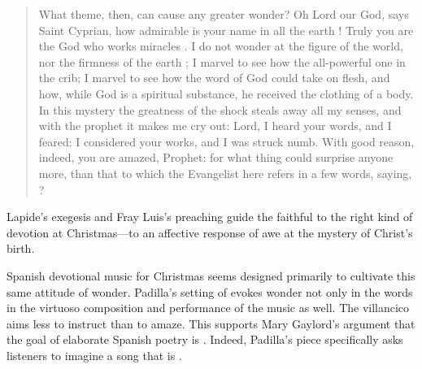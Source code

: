 \documentclass[12pt]{book}
\newcommand{\wtitle}{\worktitle}
\begin{document}
\begin{quote}
    What theme, then, can cause any greater wonder?  Oh Lord our God, says Saint
    Cyprian, how admirable is your name in all the earth ! Truly you
    are the God who works miracles .  \Dots{} I do not wonder at
    the figure of the world, nor the firmness of the earth \Dots{}; I marvel to
    see how the all-powerful one in the crib; I marvel to see how the word of
    God could take on flesh, and how, while God is a spiritual substance, he
    received the clothing of a body. \Dots{} In this mystery the greatness of
    the shock steals away all my senses, and with the prophet  it
    makes me cry out: Lord, I heard your words, and I feared: I considered your
    works, and I was struck numb.  With good reason, indeed, you are amazed,
    Prophet: for what thing could surprise anyone more, than that to which the
    Evangelist here refers in a few words, saying, ?%
        \Autocite
        [38: ]
        {LuisdeGranada:Xmas}
\end{quote}
Lapide's exegesis and Fray Luis's preaching guide the faithful to the right kind
of devotion at Christmas---to an affective response of awe at the mystery of
Christ's birth.

Spanish devotional music for Christmas seems designed primarily to cultivate
this same attitude of wonder.
Padilla's setting of \wtitle{Voces, las de la capilla} evokes wonder not only in
the words in the virtuoso composition and performance of the music as well.
The villancico aims less to instruct than to amaze. 
This supports Mary Gaylord's argument that the goal of elaborate Spanish poetry
is .%
\Autocite[227]{Gaylord:Poetry}
Indeed, Padilla's piece specifically asks listeners to imagine a song that is
.
\end{document}
